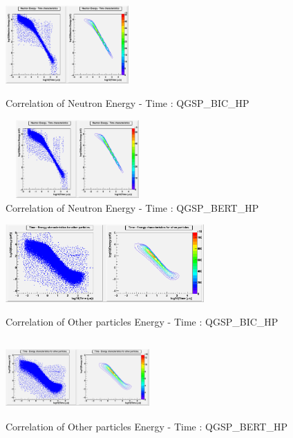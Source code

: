 \documentclass[twocolumn,amsmath,amssymb]{snp}
\begin{document}
\begin{figure}
    \centering 
    \begin{minipage}[b]{0.4\textwidth}
    \includegraphics [height=30mm, width=55 mm] {NeutEnergyTimeBIC.png}
    \caption{\small Correlation of Neutron Energy - Time : QGSP\_BIC\_HP}
    \end{minipage}
    \begin{minipage}[b]{0.4\textwidth}
    \includegraphics [height=30mm, width=55mm] {NeutEnergyTimeBERT.png}
    \caption{\small Correlation of Neutron Energy - Time : QGSP\_BERT\_HP}
    \end{minipage}
\end{figure}    


\begin{figure}
     \centering 
    \begin{minipage}[b]{0.4\textwidth}
    \includegraphics [height=30mm, width=55 mm] {OtherEnergyTimeBIC.png}
    \caption{\small Correlation of Other particles Energy - Time : QGSP\_BIC\_HP}
    \end{minipage}
    \begin{minipage}[b]{0.4\textwidth}
    \includegraphics [height=30mm, width=55mm] {OtherEnergyTimeBERT.png}
    \caption{\small Correlation of Other particles Energy - Time : QGSP\_BERT\_HP}
    \end{minipage}
\end{figure}
\end{document}
